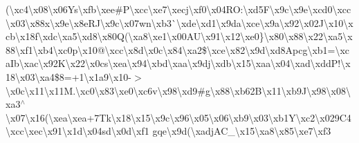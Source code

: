 \begin{DoxyCompactItemize}
(\textbackslash{}xc4\textbackslash{}x08\textbackslash{}x06\+Ys\textbackslash{}xfb\textbackslash{}xee\#\+P\textbackslash{}xcc\textbackslash{}xe7\textbackslash{}xecj\textbackslash{}xf0\textbackslash{}x04\+R\+O\+:\textbackslash{}xd5\+F\textbackslash{}x9c\textbackslash{}x9e\textbackslash{}xcd0\textbackslash{}xcc\textbackslash{}x03\textbackslash{}x88x\textbackslash{}x9e\textbackslash{}x8e\+R\+J\textbackslash{}x9c\textbackslash{}x07wn\textbackslash{}xb3\`{}\textquotesingle{}\textbackslash{}xde\textbackslash{}xd1\textbackslash{}x9da\textbackslash{}xce\textbackslash{}x9a\textbackslash{}x92\textbackslash{}x02\+J\textbackslash{}x10\textbackslash{}xcb\textbackslash{}x18f\textbackslash{}xdc\textbackslash{}xa5\textbackslash{}xd8\textbackslash{}x80\+Q(\textbackslash{}xa8\textbackslash{}xe1\textbackslash{}x00\+A\+U\textbackslash{}x91\textbackslash{}x12\textbackslash{}xe0\}\textbackslash{}x80\textbackslash{}x88\textbackslash{}x22\textbackslash{}xa5\textbackslash{}x88\textbackslash{}xf1\textbackslash{}xb4\textbackslash{}xc0p\textbackslash{}x10@\textbackslash{}xcc\textbackslash{}x8d\textbackslash{}x0c\textbackslash{}x84\textbackslash{}xa2\$\textbackslash{}xce\textbackslash{}x82\textbackslash{}x9d\textbackslash{}xd8\+Apcg\textbackslash{}xb1=\textbackslash{}xca\+Ib\textbackslash{}xac\textbackslash{}x92\+K\textbackslash{}x22\textbackslash{}x0cs\textbackslash{}xea\textbackslash{}x94\textbackslash{}xbd\textbackslash{}xaa\textbackslash{}x9dj\textbackslash{}xdb\textbackslash{}x15\textbackslash{}xaa\textbackslash{}x04\textbackslash{}xad\textbackslash{}xdd\+P!\textbackslash{}x18\textbackslash{}x03\textbackslash{}xa4\$8=+1\textbackslash{}x1a9\textbackslash{}x10-\/$>$\textbackslash{}x0c\textbackslash{}x11\textbackslash{}x11\+M.\textbackslash{}xc0\textbackslash{}x83\textbackslash{}xe0\textbackslash{}xc6v\textbackslash{}x98\textbackslash{}xd9\#g\textbackslash{}x88\textbackslash{}xb62\+B\textbackslash{}x11\textbackslash{}xb9\+J\textbackslash{}x98\textbackslash{}x08\textbackslash{}xa3$^\wedge$\textbackslash{}x07\textbackslash{}x16(\textbackslash{}xea\textbackslash{}xea+7\+Tk\textbackslash{}x18\textbackslash{}x15\textbackslash{}x9c\textbackslash{}x96\textbackslash{}x05\textbackslash{}x06\textbackslash{}xb9\textbackslash{}x03\textbackslash{}xb1\+Y\textbackslash{}xc2\textquotesingle{}\textbackslash{}x029\+C4\textbackslash{}xcc\textbackslash{}xec\textbackslash{}x91\textbackslash{}x1d\textbackslash{}x04sd\textbackslash{}x0d\textbackslash{}xf1 gqe\textbackslash{}x9d(\textbackslash{}xadj\+A\+C\+\_\+\textbackslash{}x15\textbackslash{}xa8\textbackslash{}x85\textbackslash{}xe7\textbackslash{}xf3 
\end{DoxyCompactItemize}
